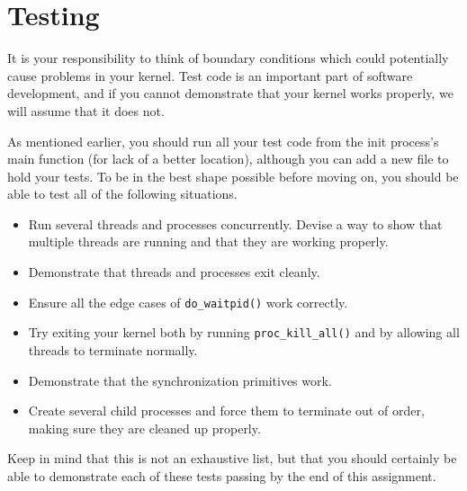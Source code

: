 \section{Testing}

It is your responsibility to think of boundary conditions which could potentially cause problems in your kernel. Test code is an important part of software development, and if you cannot demonstrate that your kernel works properly, we will assume that it does not.

As mentioned earlier, you should run all your test code from the init process's main function (for lack of a better location), although you can add a new file to hold your tests. To be in the best shape possible before moving on, you should be able to test all of the following situations.
\begin{itemize}
    \item Run several threads and processes concurrently. Devise a way to show that multiple threads are running and that they are working properly.
    \item Demonstrate that threads and processes exit cleanly.
    \item Ensure all the edge cases of \texttt{do\_waitpid()} work correctly.
    \item Try exiting your kernel both by running \texttt{proc\_kill\_all()} and by allowing all threads to terminate normally.
    \item Demonstrate that the synchronization primitives work.
    \item Create several child processes and force them to terminate out of order, making sure they are cleaned up properly.
\end{itemize}
Keep in mind that this is not an exhaustive list, but that you should certainly be able to demonstrate each of these tests passing by the end of this assignment.

